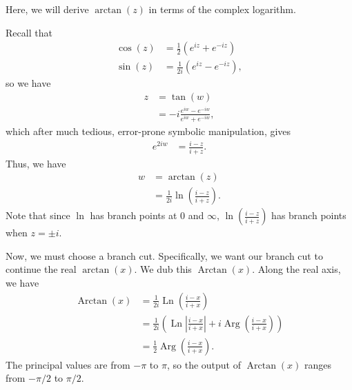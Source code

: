 \documentclass[10pt]{mypackage}
\DeclareMathOperator{\Ln}{Ln}
\DeclareMathOperator{\Arg}{Arg}
\DeclareMathOperator{\Arctan}{Arctan}
\begin{document}
\begin{example}
  Here, we will derive $\arctan(z)$ in terms of the complex logarithm.\newline

  Recall that
  \begin{align*}
    \cos\left( z \right) &= \frac{1}{2}\left( e^{iz} + e^{-iz} \right)\\
    \sin\left( z \right) &= \frac{1}{2i} \left( e^{iz} - e^{-iz} \right),
  \end{align*}
  so we have
  \begin{align*}
    z &= \tan\left( w \right)\\
      &= -i \frac{e^{iw} - e^{-iw}}{e^{iw} + e^{-iw}},
  \end{align*}
  which after much tedious, error-prone symbolic manipulation, gives
  \begin{align*}
    e^{2iw} &= \frac{i-z}{i+z}.
  \end{align*}
  Thus, we have
  \begin{align*}
    w &= \arctan\left( z \right)\\
      &= \frac{1}{2i}\ln\left( \frac{i-z}{i+z} \right).
  \end{align*}
  Note that since $\ln$ has branch points at $0$ and $\infty$, $\ln\left( \frac{i-z}{i+z} \right)$ has branch points when $z = \pm i$.\newline

  Now, we must choose a branch cut. Specifically, we want our branch cut to continue the real $\arctan(x)$. We dub this $\Arctan(x)$. Along the real axis, we have
  \begin{align*}
    \Arctan(x) &= \frac{1}{2i} \Ln\left( \frac{i-x}{i+x} \right)\\
               &= \frac{1}{2i} \left( \Ln\left\vert \frac{i-x}{i+x} \right\vert + i\Arg\left( \frac{i-x}{i+x} \right) \right)\\
               &= \frac{1}{2} \Arg\left( \frac{i-x}{i+x} \right).
  \end{align*}
  The principal values are from $-\pi$ to $\pi$, so the output of $\Arctan(x)$ ranges from $-\pi/2$ to $\pi/2$.
\end{example}
\end{document}
